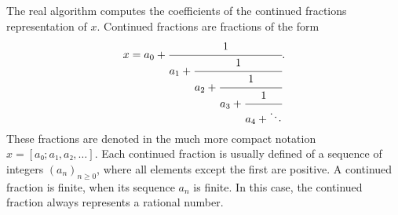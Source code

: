 The real algorithm computes the coefficients of the continued fractions representation of $x$.
Continued fractions are fractions of the form
\[
  x = a_0 + \cfrac{1}{a_1 + \cfrac{1}{a_2 + \cfrac{1}{a_3 + \cfrac{1}{a_4 + \ddots}}}}.
\]
These fractions are denoted in the much more compact notation $x = [a₀; a₁, a₂, …]$.
Each continued fraction is usually defined of a sequence of integers $(a_n)_{n ≥ 0}$,
where all elements except the first are positive.
A continued fraction is finite, when its sequence $a_n$ is finite.
In this case, the continued fraction always represents a rational number.
